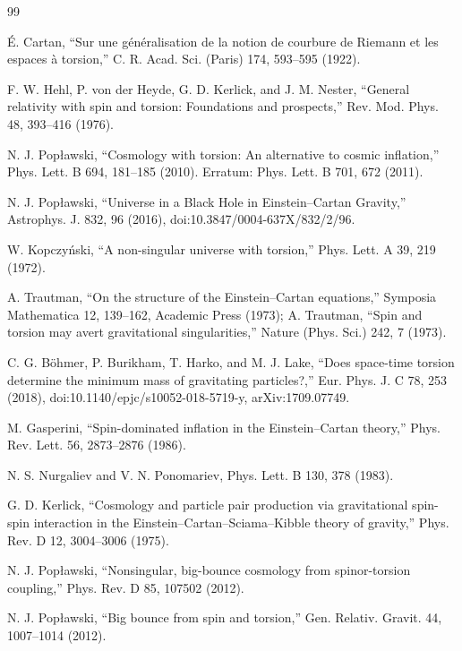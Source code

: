 \documentclass[11pt]{article}
\begin{document}
\begin{thebibliography}{99}

 \'{E}. Cartan, ``Sur une g\'en\'eralisation de la
notion de courbure de Riemann et les espaces \`a torsion,'' C. R.
Acad. Sci. (Paris) 174, 593--595 (1922).

 F. W. Hehl, P. von der Heyde, G. D. Kerlick, and
J. M. Nester, ``General relativity with spin and torsion: Foundations
and prospects,'' Rev. Mod. Phys. 48, 393--416 (1976).

 N. J. Pop{\l}awski, ``Cosmology with torsion:
An alternative to cosmic inflation,'' Phys. Lett. B 694, 181--185
(2010). Erratum: Phys. Lett. B 701, 672 (2011).

 N. J. Pop{\l}awski, ``Universe in a Black Hole
in Einstein--Cartan Gravity,'' Astrophys. J. 832, 96 (2016),
doi:10.3847/0004-637X/832/2/96.

 W. Kopczy\'nski, ``A non-singular universe with
torsion,'' Phys. Lett. A 39, 219 (1972).

 A. Trautman, ``On the structure of the
Einstein--Cartan equations,'' Symposia Mathematica 12, 139--162,
Academic Press (1973); A. Trautman, ``Spin and torsion may avert
gravitational singularities,'' Nature (Phys. Sci.) 242, 7 (1973).

 C. G. B\"ohmer, P. Burikham, T. Harko, and
M. J. Lake, ``Does space-time torsion determine the minimum mass of
gravitating particles?,'' Eur. Phys. J. C 78, 253 (2018),
doi:10.1140/epjc/s10052-018-5719-y, arXiv:1709.07749.

 M. Gasperini, ``Spin-dominated inflation in the
Einstein--Cartan theory,'' Phys. Rev. Lett. 56, 2873--2876 (1986).

 N. S. Nurgaliev and V. N. Ponomariev,
Phys. Lett. B 130, 378 (1983).

 G. D. Kerlick, ``Cosmology and particle pair
production via gravitational spin-spin interaction in the
Einstein--Cartan--Sciama--Kibble theory of gravity,'' Phys. Rev. D 12,
3004--3006 (1975).

 N. J. Pop{\l}awski, ``Nonsingular,
big-bounce cosmology from spinor-torsion coupling,'' Phys. Rev. D 85,
107502 (2012).

 N. J. Pop{\l}awski, ``Big bounce from spin and
torsion,'' Gen. Relativ. Gravit. 44, 1007--1014 (2012).


\end{thebibliography}
\end{document}
